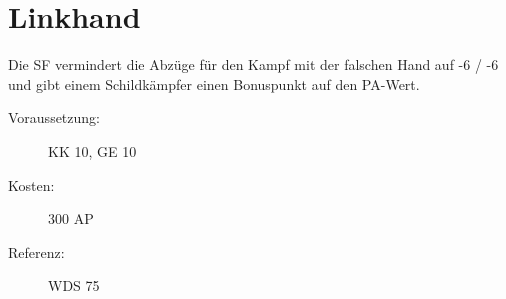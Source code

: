 \section{Linkhand}
\label{sf.linkhand}
Die SF  vermindert die Abzüge für den Kampf mit der falschen Hand auf -6 / -6 und gibt einem Schildkämpfer einen Bonuspunkt auf den PA-Wert.
\begin{description}
    \item[Voraussetzung:]
        KK 10, GE 10
    \item [Kosten:]
        300 AP
    \item [Referenz:]
        WDS 75
\end{description}
